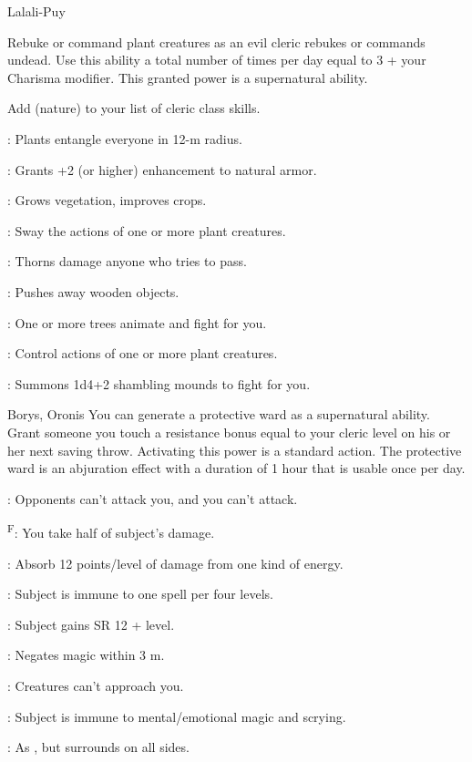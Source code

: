 {Lalali-Puy}
{Rebuke or command plant creatures as an evil cleric rebukes or commands undead. Use this ability a total number of times per day equal to 3 + your Charisma modifier. This granted power is a supernatural ability.

Add  (nature) to your list of cleric class skills.}
{
	\item {}: Plants entangle everyone in 12-m radius.
	\item {}: Grants +2 (or higher) enhancement to natural armor.
	\item {}: Grows vegetation, improves crops.
	\item {}: Sway the actions of one or more plant creatures.
	\item {}: Thorns damage anyone who tries to pass.
	\item {}: Pushes away wooden objects.
	\item {}: One or more trees animate and fight for you.
	\item {}: Control actions of one or more plant creatures.
	\item {}: Summons 1d4+2 shambling mounds to fight for you.
}

{Borys, Oronis}
{You can generate a protective ward as a supernatural ability. Grant someone you touch a resistance bonus equal to your cleric level on his or her next saving throw. Activating this power is a standard action. The protective ward is an abjuration effect with a duration of 1 hour that is usable once per day.}
{
	\item {}: Opponents can't attack you, and you can't attack.
	\item {}\textsuperscript{F}: You take half of subject's damage.
	\item {}: Absorb 12 points/level of damage from one kind of energy.
	\item {}: Subject is immune to one spell per four levels.
	\item {}: Subject gains SR 12 + level.
	\item {}: Negates magic within 3 m.
	\item {}: Creatures can't approach you.
	\item {}: Subject is immune to mental/emotional magic and scrying.
	\item {}: As , but surrounds on all sides.
}

